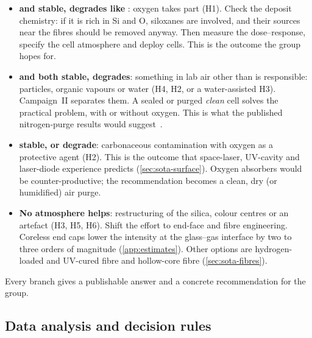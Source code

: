 \begin{decisionbox}
\begin{itemize}[leftmargin=1em]
  \item \textbf{ and  stable,  degrades like }: oxygen takes part
        (H1). Check the deposit chemistry: if it is rich in Si and O, siloxanes are involved, and their
        sources near the fibres should be removed anyway. Then measure the \Oxy{} dose--response,
        specify the cell atmosphere and deploy  cells. This is the outcome the group hopes for.
  \item \textbf{ and  both stable,  degrades}: something in lab air other than
        \Oxy{} is responsible: particles, organic vapours or water (H4, H2, or a water-assisted H3).
        Campaign~II separates them. A sealed or purged \emph{clean} cell solves the practical problem, with
        or without oxygen. This is what the published nitrogen-purge results would suggest~\cite{Marciniak2017}.
  \item \textbf{ stable,  or  degrade}: carbonaceous contamination with
        oxygen as a protective agent (H2). This is the outcome that space-laser, UV-cavity and laser-diode
        experience predicts (\cref{sec:sota-surface}). Oxygen absorbers would be counter-productive; the
        recommendation becomes a clean, dry (or humidified) air purge.
  \item \textbf{No atmosphere helps}: restructuring of the silica, colour centres or an artefact (H3, H5,
        H6). Shift the effort to end-face and fibre engineering. Coreless end caps lower the intensity at
        the glass--gas interface by two to three orders of magnitude (\cref{app:estimates}). Other options are
        hydrogen-loaded and UV-cured fibre and hollow-core fibre (\cref{sec:sota-fibres}).
\end{itemize}
Every branch gives a publishable answer and a concrete recommendation for the group.
\end{decisionbox}

\subsection{Data analysis and decision rules}\label{sec:analysis}
